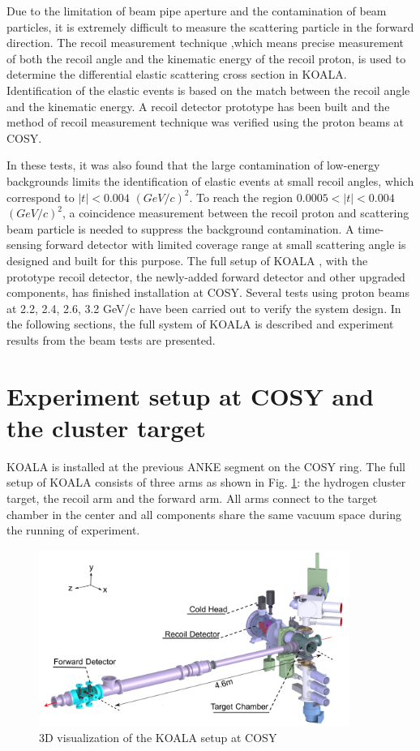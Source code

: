 \documentclass[number]{elsarticle}
\begin{document}
Due to the limitation of beam pipe aperture and the contamination of beam particles,
it is extremely difficult to measure the scattering particle in the forward direction.
The recoil measurement technique ,which means precise measurement of  both the recoil angle and the kinematic energy of the recoil proton, 
is used to determine the differential elastic scattering cross section in KOALA.
Identification of the elastic events is based on the match between the recoil angle and the kinematic energy.
A recoil detector prototype has been built and the method of recoil measurement technique was verified using the proton beams at COSY.

In these tests, it was also found that the large contamination of low-energy backgrounds limits the identification of elastic events at small recoil angles,
which correspond to \(|t| < 0.004\) \((GeV/c)^2\).
To reach the region \(0.0005 < |t| < 0.004\) \((GeV/c)^2\), a coincidence measurement between the recoil proton and scattering beam particle is needed to suppress the background contamination.
A time-sensing forward detector with limited coverage range at small scattering angle is designed and built for this purpose. 
The full setup of KOALA , with the prototype recoil detector, the newly-added forward detector and other upgraded components,  has finished installation at COSY.
Several tests using proton beams at 2.2, 2.4, 2.6, 3.2 GeV/c have been carried out to verify the system design.
In the following sections,  the full system of KOALA is described and experiment results from the beam tests are presented.

\section{Experiment setup at COSY and the cluster target}
\label{sec:setup}

KOALA is installed at the previous ANKE segment on the COSY ring.
The full setup of KOALA consists of three arms as shown in Fig. \ref{fig:setup}: the hydrogen cluster target, the recoil arm and the forward arm.
All arms connect to the target chamber in the center and all components share the same vacuum space during the running of experiment.

\begin{figure}[htbp]
\centering
\includegraphics[width=0.9\textwidth]{./koala_setup.png}
\caption{3D visualization of the KOALA setup at COSY}
\label{fig:setup}
\end{figure}
\end{document}
